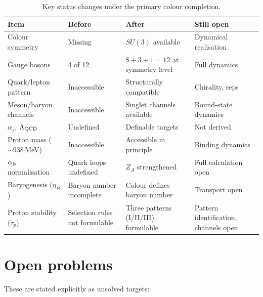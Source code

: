 \documentclass[11pt,a4paper]{article}
\begin{document}
\begin{table}[H]
\centering
\small
\caption{Key status changes under the primary colour completion.}
\begin{tabular}{@{}p{3.2cm}p{3.2cm}p{3.2cm}p{3cm}@{}}
\toprule
Item & Before & After & Still open \\
\midrule
Colour symmetry & Missing & $SU(3)$ available & Dynamical realisation \\
Gauge bosons & 4 of 12 & $8+3+1=12$ at symmetry level & Full dynamics \\
Quark/lepton pattern & Inaccessible & Structurally compatible & Chirality, reps \\
Meson/baryon channels & Inaccessible & Singlet channels available & Bound-state dynamics \\
$\alpha_s$, $\Lambda_{\rm QCD}$ & Undefined & Definable targets & Not derived \\
Proton mass ($\sim\!938$\,MeV) & Inaccessible & Accessible in principle & Binding dynamics \\
$\alpha_{\rm fs}$ normalisation & Quark loops undefined & $Z_A$ strengthened & Full calculation open \\
Baryogenesis ($\eta_B$) & Baryon number incomplete & Colour defines baryon number & Transport open \\
Proton stability ($\tau_p$) & Selection rules not formulable & Three patterns (I/II/III) formulable & Pattern identification, channels open \\
\bottomrule
\end{tabular}
\end{table}


\section{Open problems}

These are stated explicitly as unsolved targets:
\end{document}
